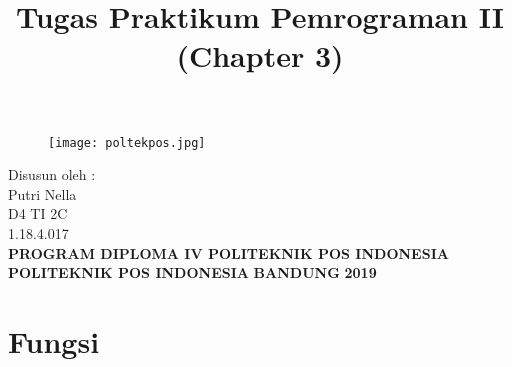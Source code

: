 \documentclass[a4paper, 12pt]{article}
\begin{document}
\title{\huge\textbf{Tugas Praktikum Pemrograman II (Chapter 3)}}
\date{}

\maketitle


\begin{figure}[!ht]
\begin{center}
\texttt{[image: poltekpos.jpg]}
\end{center}
\end{figure}

\begin{center}
\vspace{1cm}
Disusun oleh :\\
Putri Nella\\
D4 TI 2C\\
1.18.4.017\\
\vspace{1cm}
\textbf{PROGRAM DIPLOMA IV POLITEKNIK POS INDONESIA} \linebreak
\textbf{POLITEKNIK POS INDONESIA} \linebreak
\textbf{BANDUNG}\linebreak
\textbf{2019}

\end{center}


\thispagestyle{empty}


\section{Fungsi}
\end{document}
